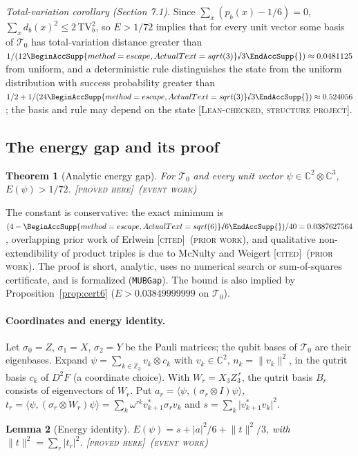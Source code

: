 \documentclass[11pt]{article}
\newcommand{\rnum}[1]{\BeginAccSupp{method=escape,ActualText=sqrt(#1)}\text{\textsurd}#1\EndAccSupp{}}
\newcommand{\rsix}{\rnum{6}}
\newcommand{\C}{\mathbb{C}}
\newcommand{\ip}[2]{\langle #1,#2\rangle}
\newcommand{\abs}[1]{\lvert #1\rvert}
\newcommand{\norm}[1]{\lVert #1\rVert}
\newcommand{\Tz}{\mathcal{T}_0}          %
\newcommand{\E}{E}                       %
\newcommand{\st}[1]{\textsc{[#1]}}
\newcommand{\stproved}{\st{proved here}}
\newcommand{\stlean}{\st{Lean-checked, structure project}}
\newcommand{\stcited}{\st{cited}}
\newcommand{\event}{\textsc{(event work)}}
\newcommand{\prior}{\textsc{(prior work)}}
\newtheorem{theorem}{Theorem}
\newtheorem{lemma}[theorem]{Lemma}
\theoremstyle{definition}
\theoremstyle{remark}
\begin{document}
\emph{Total-variation corollary (Section 7.1).} Since $\sum_x(p_b(x)-1/6)=0$, $\sum_xd_b(x)^2\le2\,\mathrm{TV}_b^2$, so
$\E>1/72$ implies that for every unit vector some basis of $\Tz$ has total-variation distance greater than
$1/(12\rnum{3})\approx0.0481125$ from uniform, and a deterministic rule distinguishes the state from the uniform
distribution with success probability greater than $1/2+1/(24\rnum{3})\approx0.524056$; the basis and rule may depend
on the state \stlean.

\subsection{The energy gap and its proof}

\begin{theorem}[Analytic energy gap]\label{thm:gap72}
For $\Tz$ and every unit vector $\psi\in\C^2\otimes\C^3$, $\E(\psi)>1/72$.
\stproved\ \event
\end{theorem}

The constant is conservative: the exact minimum is $(4-\rsix)/40=0.0387627564$, overlapping prior work of
Erlwein \cite{Erlwein} \stcited\ \prior, and qualitative non-extendibility of product triples is due to McNulty and
Weigert \cite{MW12} \stcited\ \prior. The proof is short, analytic, uses no numerical search or sum-of-squares
certificate, and is formalized (\texttt{MUBGap}). The bound is also implied by Proposition~\ref{prop:cert6}
($\E>0.03849999999$ on $\Tz$).

\paragraph{Coordinates and energy identity.}\label{app:coords} Let $\sigma_0=Z$, $\sigma_1=X$, $\sigma_2=Y$ be the
Pauli matrices; the qubit bases of $\Tz$ are their eigenbases. Expand
$\psi=\sum_{k\in\mathbb{Z}_3}v_k\otimes c_k$ with $v_k\in\C^2$, $n_k=\norm{v_k}^2$, in the qutrit basis $c_k$ of
$D^2F$ (a coordinate choice). With $W_r=X_3Z_3^{\,r}$, the qutrit basis $B_r$ consists of eigenvectors of $W_r$.
Put $a_r=\ip{\psi}{(\sigma_r\otimes I)\psi}$, $t_r=\ip{\psi}{(\sigma_r\otimes W_r)\psi}=\sum_k\omega^{rk}v_{k+1}^\ast\sigma_rv_k$
and $s=\sum_k\abs{v_{k+1}^\ast v_k}^2$. 

\begin{lemma}[Energy identity]\label{lem:energyid}
$\E(\psi)=s+\abs{a}^2/6+\norm{t}^2/3$, with $\norm t^2=\sum_r\abs{t_r}^2$. \stproved\ \event
\end{lemma}
\end{document}
